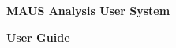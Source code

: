 \documentclass[a4paper, 10pt] {report}
\begin{document}
\vspace*{2.0cm}

\begin{center}
\Large{ \bf{MAUS Analysis User System} }

\Large{ \bf{User Guide} }
\end{center}

\tableofcontents

\newpage






%
%
%
%
%

%


\end{document}
